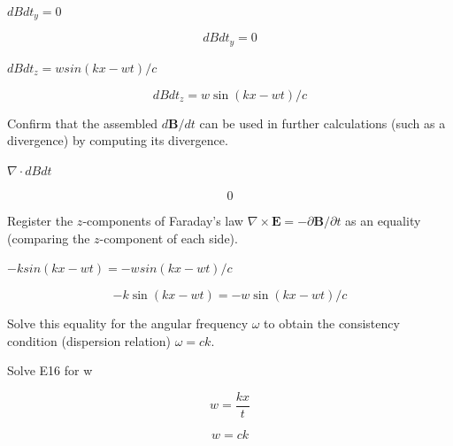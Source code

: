 \documentclass[dvipdfmx]{article}
\begin{document}
$dBdt_y = 0$

\begin{equation}
  dBdt_y = 0
  \label{eq:E13}
\end{equation}

$dBdt_z = w sin(k x - w t)/c$

\begin{equation}
  dBdt_z = w \sin(k x - w t)/c
  \label{eq:E14}
\end{equation}

Confirm that the assembled $d\mathbf B/dt$ can be used in further calculations (such as a divergence) by computing its divergence.

$\nabla \cdot dBdt$

\begin{equation}
  0
  \label{eq:E15}
\end{equation}

Register the $z$-components of Faraday's law $\nabla\times\mathbf E=-\partial\mathbf B/\partial t$ as an equality (comparing the $z$-component of each side).

$-k sin(k x - w t) = -w sin(k x - w t)/c$

\begin{equation}
  -k \sin(k x - w t) = -w \sin(k x - w t)/c
  \label{eq:E16}
\end{equation}

Solve this equality for the angular frequency $\omega$ to obtain the consistency condition (dispersion relation) $\omega=ck$.

Solve E16 for w

\begin{equation}
  w = \frac{k x}{t}
  \label{eq:E17}
\end{equation}

\begin{equation}
  w = c k
  \label{eq:E18}
\end{equation}
\end{document}
